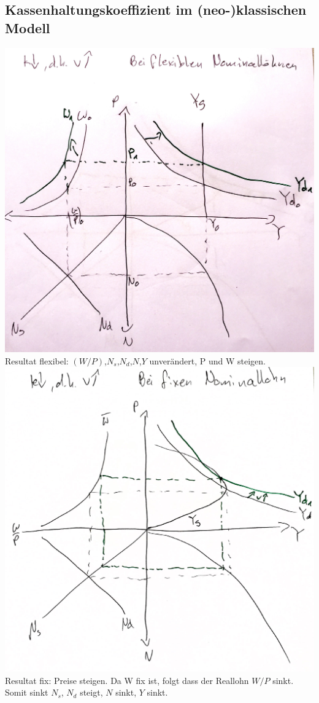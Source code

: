 \documentclass{scrartcl}
\begin{document}
\subsection{Kassenhaltungskoeffizient im (neo-)klassischen Modell}
\includegraphics[width=.75\textwidth]{Bilder/Klassik_Kassenhaltung_Flex.pdf}\\
Resultat flexibel: $(W/P)$,$N_s$,$N_d$,$N$,$Y$ unver\"{a}ndert, P und W steigen.\\
\includegraphics[width=.75\textwidth]{Bilder/Klassik_Kassenhaltung_Fix.pdf}\\
Resultat fix: Preise steigen. Da W fix ist, folgt dass der Reallohn $W/P$ sinkt. Somit sinkt $N_s$, $N_d$ steigt, $N$ sinkt, $Y$ sinkt.
\end{document}
